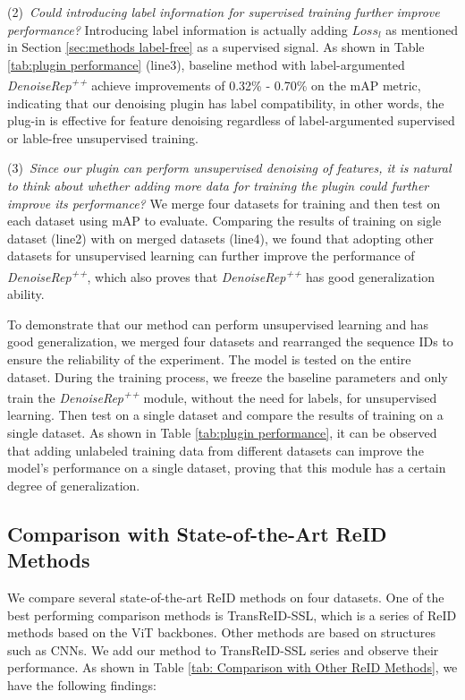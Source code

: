 \documentclass[conference]{IEEEtran}
\begin{document}
{(2)~\textit{Could introducing label information for supervised training further improve performance?}
Introducing label information is actually adding $Loss_{l}$ as mentioned in Section \ref{sec:methods label-free} as a supervised signal. As shown in Table \ref{tab:plugin performance} (line3), baseline method with label-argumented \textit{DenoiseRep\textsuperscript{++}} achieve improvements of 0.32\% - 0.70\% on the mAP metric, indicating that our denoising plugin has label compatibility, in other words, the plug-in is effective for feature denoising regardless of label-argumented supervised or lable-free unsupervised training.

(3)~\textit{Since our plugin can perform unsupervised denoising of features, it is natural to think about whether adding more data for training the plugin could further improve its performance?}
We merge four datasets for training and then test on each dataset using mAP to evaluate. Comparing the results of training on sigle dataset (line2) with on merged datasets (line4), we found that adopting other datasets for unsupervised learning can further improve the performance of \textit{DenoiseRep\textsuperscript{++}}, which also proves that \textit{DenoiseRep\textsuperscript{++}} has good generalization ability.

To demonstrate that our method can perform unsupervised learning and has good generalization, we merged four datasets and rearranged the sequence IDs to ensure the reliability of the experiment. The model is tested on the entire dataset. During the training process, we freeze the baseline parameters and only train the \textit{DenoiseRep\textsuperscript{++}} module, without the need for labels, for unsupervised learning. Then test on a single dataset and compare the results of training on a single dataset. As shown in Table \ref{tab:plugin performance}, it can be observed that adding unlabeled training data from different datasets can improve the model's performance on a single dataset, proving that this module has a certain degree of generalization.



\subsection{Comparison with State-of-the-Art ReID Methods}
We compare several state-of-the-art ReID methods on four datasets. One of the best performing comparison methods is TransReID-SSL, which is a series of ReID methods based on the ViT backbones. Other methods are based on structures such as CNNs. We add our method to TransReID-SSL series and observe their performance. As shown in Table \ref{tab: Comparison with Other ReID Methods}, we have the following findings:

}
\end{document}
